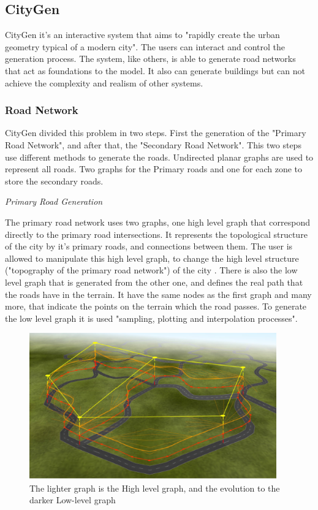 \subsection{CityGen} %
\label{sec:citygen}
\cite{Kelly2008}

CityGen it's an interactive system that aims  to "rapidly create the urban geometry typical of a modern city". The users can interact and control the generation process. The system, like others, is able to generate road networks that act as foundations to the model. It also can generate buildings but can not achieve the complexity and realism of other systems.


\subsubsection{Road Network} %
\label{ssub:road_network}


CityGen divided this problem in two steps. First the generation of the "Primary Road Network", and after that, the "Secondary Road Network". This two steps use different methods to generate the roads.
Undirected planar graphs are used to represent all roads. Two graphs for the Primary roads and one for each zone to store the secondary roads.


\emph{Primary Road Generation}

The primary road network uses two graphs, one high level graph that correspond directly to the primary road intersections. It represents the topological structure of the city by it's primary roads, and connections between them. The user is allowed to manipulate this high level graph, to change the high level structure ("topography of the primary road network") of the city .
There is also the low level graph that is generated from the other one, and defines the real path that the roads have in the terrain. It have the same nodes as the first graph and many more, that indicate the points on the terrain which the road passes.
To generate the low level graph it is used "sampling, plotting and interpolation processes".


	

\begin{figure}[htbp]
	\centering
	\includegraphics[width=0.95\textwidth]{img/CityGen/RoadGraphs.png}
	\caption{The lighter graph is the High level graph, and the evolution to the darker Low-level graph }
	\label{fig:graphs}
\end{figure}

